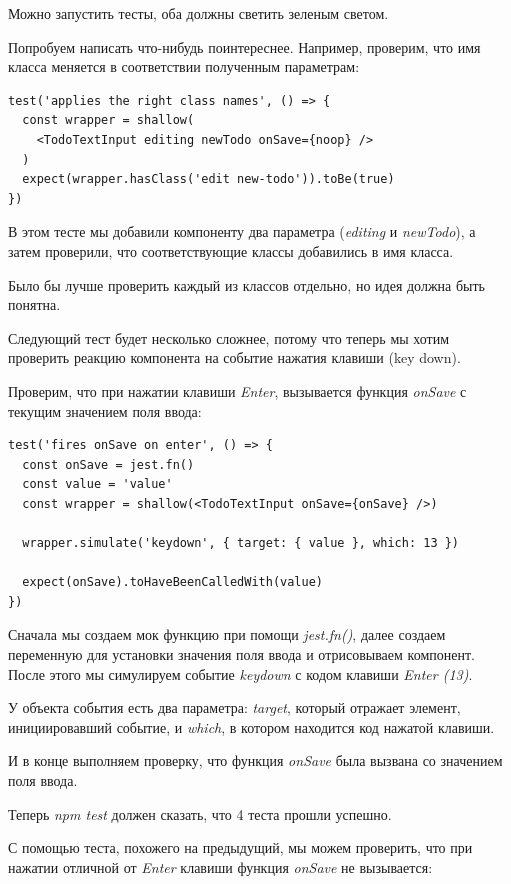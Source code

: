 Можно запустить тесты, оба должны светить зеленым светом.

Попробуем написать что-нибудь поинтереснее. Например, проверим, что имя класса меняется в соответствии полученным параметрам:

\begin{lstlisting}
test('applies the right class names', () => {
  const wrapper = shallow(
    <TodoTextInput editing newTodo onSave={noop} />
  )
  expect(wrapper.hasClass('edit new-todo')).toBe(true)
})
\end{lstlisting}

В этом тесте мы добавили компоненту два параметра (\textit{editing} и \textit{newTodo}), а затем проверили, что соответствующие классы добавились в имя класса.

Было бы лучше проверить каждый из классов отдельно, но идея должна быть понятна.

Следующий тест будет несколько сложнее, потому что теперь мы хотим проверить реакцию компонента на событие нажатия клавиши (key down).

Проверим, что при нажатии клавиши \textit{Enter}, вызывается функция \textit{onSave} с текущим значением поля ввода:

\begin{lstlisting}
test('fires onSave on enter', () => {
  const onSave = jest.fn()
  const value = 'value'
  const wrapper = shallow(<TodoTextInput onSave={onSave} />)
  
  wrapper.simulate('keydown', { target: { value }, which: 13 })
  
  expect(onSave).toHaveBeenCalledWith(value)
})
\end{lstlisting}

Сначала мы создаем мок функцию при помощи \textit{jest.fn()}, далее создаем переменную для установки значения поля ввода и отрисовываем компонент. После этого мы симулируем событие \textit{keydown} с кодом клавиши \textit{Enter (13)}.

У объекта события есть два параметра: \textit{target}, который отражает элемент, инициировавший событие, и \textit{which}, в котором находится код нажатой клавиши.

И в конце выполняем проверку, что функция \textit{onSave} была вызвана со значением поля ввода.

Теперь \textit{npm test} должен сказать, что 4 теста прошли успешно.

С помощью теста, похожего на предыдущий, мы можем проверить, что при нажатии отличной от \textit{Enter} клавиши функция \textit{onSave} не вызывается:

